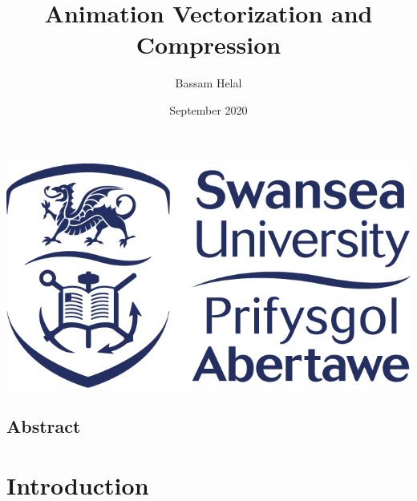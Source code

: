 \documentclass[12pt]{article}
\title{Animation Vectorization and Compression}
\author{Bassam Helal}
\date{September 2020}
\newcommand{\black}{
\pagecolor{black}
\color{white}
}
\begin{document}
    \black


    \maketitle

    \begin{center}
        \vspace{8cm}
        \includegraphics[scale=0.65]{SwanseaUniversityLogo.png}
    \end{center}

    \pagebreak

    \begin{center}
        \section*{Abstract}
    \end{center}


    \pagebreak

    \renewcommand*\contentsname{
    \begin{center}
        Table of Contents
    \end{center}}

    \tableofcontents

    \pagebreak



    \section{Introduction}\label{sec:introduction}
\end{document}
